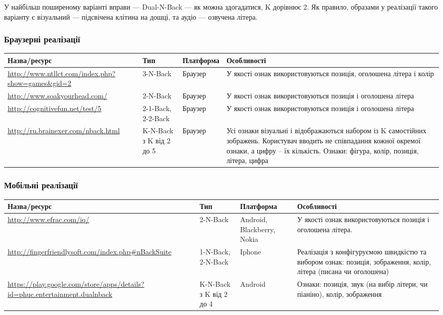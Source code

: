 У найбільш поширеному варіанті вправи — Dual-N-Back — як можна здогадатися, K дорівнює 2. Як правило, образами у реалізації такого варіанту є візуальний — підсвічена клітина на дошці, та аудіо — озвучена літера.

\subsubsection{Браузерні реалізації}
\small\begin{longtable}{| C{5cm} | C{2cm} | C{2.5cm} | C{5cm} |}
  \hline
  Назва/ресурс & Тип & Платформа & Особливості \\
  \hline
  \url{http://www.ntllct.com/index.php?show=games\&gid=2}
  & 3-N-Back
  & Браузер
  & У якості ознак використовуються позиція, оголошена літера і колір \\
  \hline
  \url{http://www.soakyourhead.com/}
  & 2-N-Back
  & Браузер
  & У якості ознак використовуються позиція і оголошена літера \\
  \hline
  \url{http://cognitivefun.net/test/5}
  & 2-1-Back, 2-2-Back
  & Браузер
  & У якості ознак використовуються позиція і оголошена літера \\
  \hline
  \url{http://ru.brainexer.com/nback.html}
  & K-N-Back з K від 2 до 5
  & Браузер
  & Усі ознаки візуальні і відображаються набором із K самостійних зображень.
  Користувач вводить не співпадання кожної окремої ознаки, а цифру – їх кількість.
  Ознаки: фігура, колір, позиція, літера, цифра \\
  \hline
\end{longtable}\normalsize
\newpage
\subsubsection{Мобільні реалізації}
\small\begin{longtable}{| C{5cm} | C{2cm} | C{2.5cm} | C{5cm} |}
  \hline
  Назва/ресурс & Тип & Платформа & Особливості \\
  \hline
  \url{http://www.efrac.com/iq/}
  & 2-N-Back
  & Android, Blackberry, Nokia
  & У якості ознак використовуються позиція і оголошена літера. \\
  \hline
  \url{http://fingerfriendlysoft.com/index.php#nBackSuite}
  & 1-N-Back, 2-N-Back
  & Iphone
  & Реалізація з конфігуруємою швидкістю та вибором ознак:
  позиція, зображення, колір, літера (писана чи оголошена) \\
  \hline
  \url{https://play.google.com/store/apps/details?id=phuc.entertainment.dualnback}
  & K-N-Back з K від 2 до 4
  & Android
  & Ознаки: позиція, звук (на вибір літери, чи піаніно), колір, зображення \\
  \hline
\end{longtable}\normalsize
\newpage
